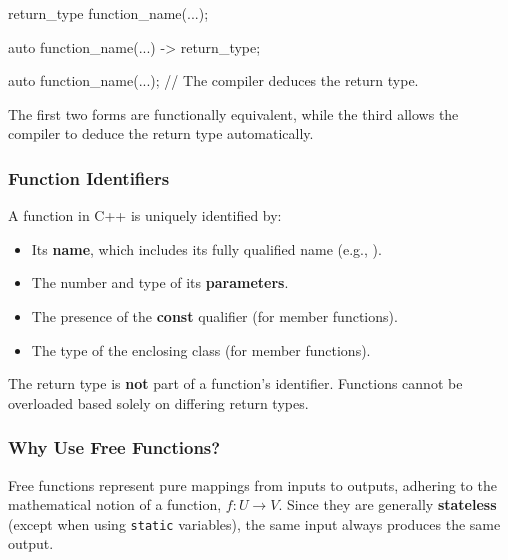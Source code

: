\begin{codeblock}[language=C++, numbers=none]
return_type function_name(...);

auto function_name(...) -> return_type;

auto function_name(...); // The compiler deduces the return type.
\end{codeblock}

\vspace{-0.5em}

The first two forms are functionally equivalent, while the third allows the compiler to deduce the return type automatically.

\vspace{-0.5em}

\subsubsection{Function Identifiers}

\vspace{-0.5em}

A function in C++ is uniquely identified by:

\begin{itemize}
    \item Its \textbf{name}, which includes its fully qualified name (e.g., ).
    \item The number and type of its \textbf{parameters}.
    \item The presence of the \textbf{const} qualifier (for member functions).
    \item The type of the enclosing class (for member functions).
\end{itemize}

\begin{warningblock}
    The return type is \textbf{not} part of a function's identifier. Functions cannot be overloaded based solely on differing return types.
\end{warningblock}

\subsubsection{Why Use Free Functions?}

\vspace{-0.5em}

Free functions represent pure mappings from inputs to outputs, adhering to the mathematical notion of a function, $f: U \rightarrow V$. Since they are generally \textbf{stateless} (except when using \texttt{static} variables), the same input always produces the same output.

